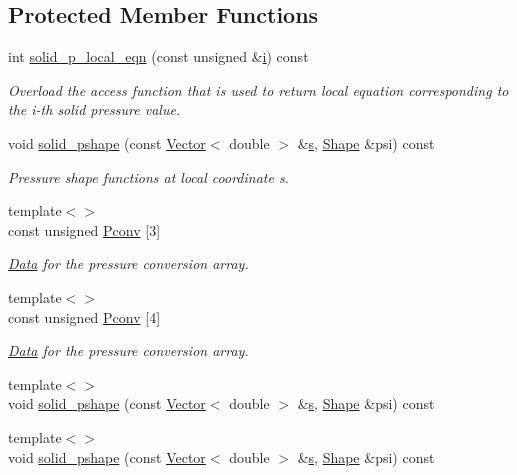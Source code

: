\subsection*{Protected Member Functions}
\begin{DoxyCompactItemize}
\item 
int \hyperlink{classoomph_1_1TPVDElementWithContinuousPressure_a0a299931244a8cc58f90050f38201919}{solid\+\_\+p\+\_\+local\+\_\+eqn} (const unsigned \&\hyperlink{cfortran_8h_adb50e893b86b3e55e751a42eab3cba82}{i}) const
\begin{DoxyCompactList}\small\item\em Overload the access function that is used to return local equation corresponding to the i-\/th solid pressure value. \end{DoxyCompactList}\item 
void \hyperlink{classoomph_1_1TPVDElementWithContinuousPressure_a5bb00d8bab9b92063a4cef340154438d}{solid\+\_\+pshape} (const \hyperlink{classoomph_1_1Vector}{Vector}$<$ double $>$ \&\hyperlink{cfortran_8h_ab7123126e4885ef647dd9c6e3807a21c}{s}, \hyperlink{classoomph_1_1Shape}{Shape} \&psi) const
\begin{DoxyCompactList}\small\item\em Pressure shape functions at local coordinate s. \end{DoxyCompactList}\item 
{\footnotesize template$<$$>$ }\\const unsigned \hyperlink{classoomph_1_1TPVDElementWithContinuousPressure_a4eac0138cea57bc72b3aaf8fe750694e}{Pconv} \mbox{[}3\mbox{]}
\begin{DoxyCompactList}\small\item\em \hyperlink{classoomph_1_1Data}{Data} for the pressure conversion array. \end{DoxyCompactList}\item 
{\footnotesize template$<$$>$ }\\const unsigned \hyperlink{classoomph_1_1TPVDElementWithContinuousPressure_a95d1f6f1e23f16350d61043b3451419e}{Pconv} \mbox{[}4\mbox{]}
\begin{DoxyCompactList}\small\item\em \hyperlink{classoomph_1_1Data}{Data} for the pressure conversion array. \end{DoxyCompactList}\item 
{\footnotesize template$<$$>$ }\\void \hyperlink{classoomph_1_1TPVDElementWithContinuousPressure_a04b5d07460826872be4ca42caf9d9c95}{solid\+\_\+pshape} (const \hyperlink{classoomph_1_1Vector}{Vector}$<$ double $>$ \&\hyperlink{cfortran_8h_ab7123126e4885ef647dd9c6e3807a21c}{s}, \hyperlink{classoomph_1_1Shape}{Shape} \&psi) const
\item 
{\footnotesize template$<$$>$ }\\void \hyperlink{classoomph_1_1TPVDElementWithContinuousPressure_a1c16f9ed2b904234fda651e961b53ddf}{solid\+\_\+pshape} (const \hyperlink{classoomph_1_1Vector}{Vector}$<$ double $>$ \&\hyperlink{cfortran_8h_ab7123126e4885ef647dd9c6e3807a21c}{s}, \hyperlink{classoomph_1_1Shape}{Shape} \&psi) const
\end{DoxyCompactItemize}
